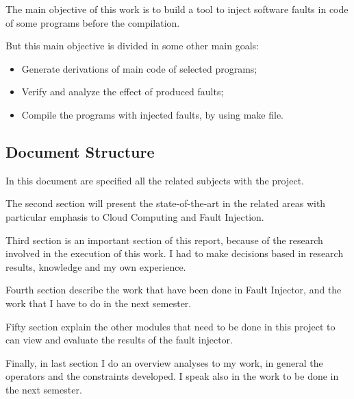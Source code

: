 The main objective of this work is to build a tool to inject software faults in code of some programs before the compilation.

But this main objective is divided in some other main goals:

\begin{itemize}
	\item Generate derivations of main code of selected programs;
	\item Verify and analyze the effect of produced faults;
	\item Compile the programs with injected faults, by using make file.
\end{itemize}


\subsection{Document Structure}

In this document are specified all the related subjects with the project.

The second section will present the state-of-the-art in the related areas with particular emphasis to Cloud Computing and Fault Injection.

Third section is an important section of this report, because of the research involved in the execution of this work. I had to make decisions based in research results, knowledge and my own experience.

Fourth section describe the work that have been done in Fault Injector, and the work that I have to do in the next semester.

Fifty section explain the other modules that need to be done in this project to can view and evaluate the results of the fault injector.

Finally, in last section I do an overview analyses to my work, in general the operators and the constraints developed. I speak also in the work to be done in the next semester.

